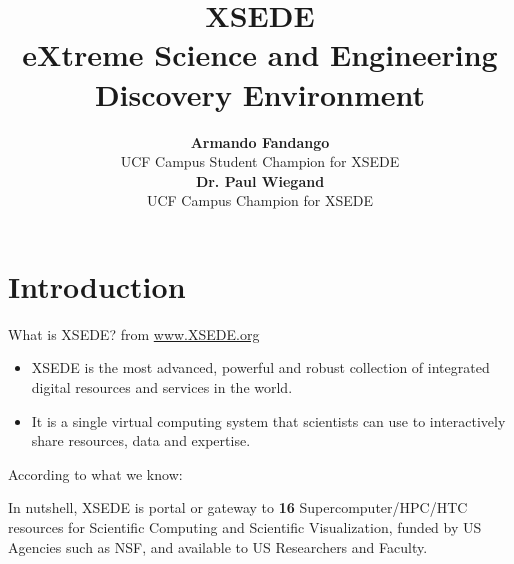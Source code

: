 \documentclass[compress,10pt]{beamer}
\title[XSEDE]{XSEDE \\ e\textbf{X}treme \textbf{S}cience and \textbf{E}ngineering \textbf{D}iscovery \textbf{E}nvironment }
\subtitle[]{}
\author[Armando Fandango]{\textbf{Armando Fandango}\\UCF Campus Student Champion for XSEDE\\\textbf{Dr. Paul Wiegand}\\UCF Campus Champion for XSEDE}
\institute[University of Central Florida]{Advanced Research Computing Center \\ University of Central Florida }
\date{}
\begin{document}

\frame[plain]{
	\titlepage 
}





\section{Introduction}

\begin{frame}{What is XSEDE?}
\pause
\centering
 from \url{www.XSEDE.org}
 
\begin{itemize}
\item XSEDE is the most advanced, powerful and robust collection of integrated digital resources and services in the world.
\item It is a single virtual computing system that scientists can use to interactively share resources, data and expertise.
\end{itemize}

\bigskip
\pause
According to what we know:
\bigskip
\pause

In nutshell, XSEDE is portal or gateway to \textbf{16} Supercomputer/HPC/HTC resources for Scientific Computing and Scientific Visualization, funded by US Agencies such as NSF, and available to US Researchers and Faculty. 
\bigskip
\bigskip




\end{frame}
\end{document}
